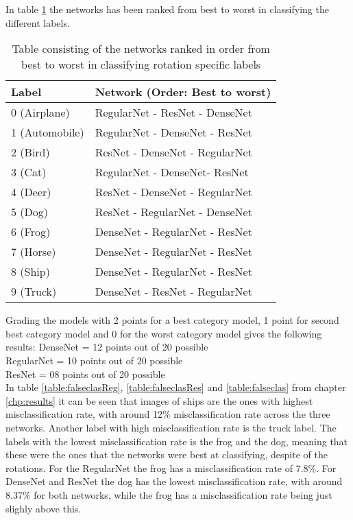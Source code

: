 In table \ref{table:results} the networks has been ranked from best to worst in classifying the different labels. 

\begin{table}[]
	\centering
	\caption{Table consisting of the networks ranked in order from best to worst in classifying rotation specific labels}
	\label{table:results}
	\begin{tabular}{|l|l|}
		\hline
		Label          & Network (Order: Best to worst) \\ \hline
		0 (Airplane)   & RegularNet - ResNet - DenseNet \\ \hline
		1 (Automobile) & RegularNet - DenseNet - ResNet \\ \hline
		2 (Bird)       & ResNet - DenseNet - RegularNet \\ \hline
		3 (Cat)        & RegularNet - DenseNet- ResNet  \\ \hline
		4 (Deer)       & ResNet - DenseNet - RegularNet \\ \hline
		5 (Dog)        & ResNet - RegularNet - DenseNet \\ \hline
		6 (Frog)       & DenseNet - RegularNet - ResNet \\ \hline
		7 (Horse)      & DenseNet - RegularNet - ResNet \\ \hline
		8 (Ship)       & DenseNet - RegularNet - ResNet \\ \hline
		9 (Truck)      & DenseNet - ResNet - RegularNet \\ \hline
	\end{tabular}
\end{table}
\FloatBarrier

Grading the models with 2 points for a best category model, 1 point for second best category model and 0 for the worst category model gives the following results:
DenseNet   = 12 points out of 20 possible\\
RegularNet = 10 points out of 20 possible\\
ResNet     = 08 points out of 20 possible\\

In table \ref{table:falseclasReg}, \ref{table:falseclasRes} and \ref{table:falseclas} from chapter \ref{chp:results} it can be seen that images of ships are the ones with highest misclassification rate, with around 12\% misclassification rate across the three networks.  Another label with high misclassification rate is the truck label. The labels with the lowest misclassification rate is the frog and the dog, meaning that these were the ones that the networks were best at classifying, despite of the rotations. For the RegularNet the frog has a misclassification rate of 7.8\%. For DenseNet and ResNet the dog has the lowest misclassification rate, with around 8.37\% for both networks, while the frog has a misclassification rate being just slighly above this.

